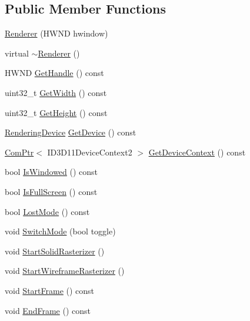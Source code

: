 \subsection*{Public Member Functions}
\begin{DoxyCompactItemize}
\item 
\hyperlink{classmage_1_1_renderer_a762dcda433c319af237d1dfd9bc6095f}{Renderer} (H\+W\+ND hwindow)
\item 
virtual \hyperlink{classmage_1_1_renderer_a997e041f28cc71d069d1ab7d29fe6ced}{$\sim$\+Renderer} ()
\item 
H\+W\+ND \hyperlink{classmage_1_1_renderer_a11d47495a47c58a0f67aae3110f9f519}{Get\+Handle} () const
\item 
uint32\+\_\+t \hyperlink{classmage_1_1_renderer_a65e448e5fa4e8b6be0371ff00b97912a}{Get\+Width} () const
\item 
uint32\+\_\+t \hyperlink{classmage_1_1_renderer_a40c90d8878416dd03b7fdef0b3de29a8}{Get\+Height} () const
\item 
\hyperlink{classmage_1_1_rendering_device}{Rendering\+Device} \hyperlink{classmage_1_1_renderer_a9465ff1640cb5333ca4e701977ae51ec}{Get\+Device} () const
\item 
\hyperlink{namespacemage_ae74f374780900893caa5555d1031fd79}{Com\+Ptr}$<$ I\+D3\+D11\+Device\+Context2 $>$ \hyperlink{classmage_1_1_renderer_a764ee3d8f3dea6aceb05f42bce80b147}{Get\+Device\+Context} () const
\item 
bool \hyperlink{classmage_1_1_renderer_a1de1804c1eedae7dc12435a520a10b9c}{Is\+Windowed} () const
\item 
bool \hyperlink{classmage_1_1_renderer_a5ae3220e19c68f47a8e4d55e3ced4694}{Is\+Full\+Screen} () const
\item 
bool \hyperlink{classmage_1_1_renderer_afdde83a1e2bc9288f000fb2575c525d0}{Lost\+Mode} () const
\item 
void \hyperlink{classmage_1_1_renderer_a9004ab608659188900c808eacb5f873c}{Switch\+Mode} (bool toggle)
\item 
void \hyperlink{classmage_1_1_renderer_a921f7e037ce57927cef9512582e9e0fe}{Start\+Solid\+Rasterizer} ()
\item 
void \hyperlink{classmage_1_1_renderer_a479f89bf1770828ffcb2395a1f467ed4}{Start\+Wireframe\+Rasterizer} ()
\item 
void \hyperlink{classmage_1_1_renderer_a5fea21434ad2ac5bcd9ca09cf5f41852}{Start\+Frame} () const
\item 
void \hyperlink{classmage_1_1_renderer_a4932c51d0f6e56269712024d2d0322ef}{End\+Frame} () const
\end{DoxyCompactItemize}
